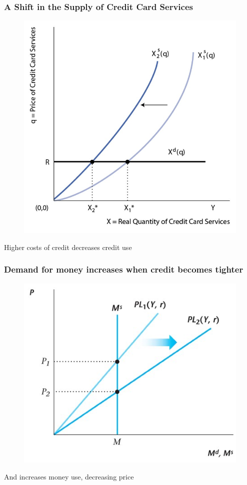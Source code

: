 \documentclass{beamer}
\begin{document}
\begin{frame}
\frametitle[alignment=center]{A Shift in the Supply of Credit Card Services}
\begin{figure}
\centering
\includegraphics[scale=0.65]{Figures/W_Fig_12pt12.png}
\end{figure}
Higher costs of credit decreases credit use
\end{frame}


\begin{frame}
\frametitle[alignment=center]{Demand for money increases when credit becomes tighter}
\begin{figure}
\centering
\includegraphics[scale=0.65]{Figures/W_Fig_12pt13.png}
\end{figure}
And increases money use, decreasing price
\end{frame}
\end{document}
